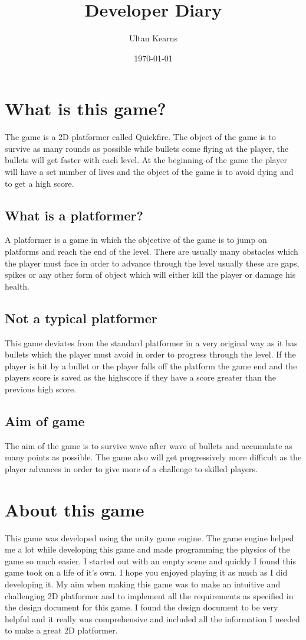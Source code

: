 \documentclass{report}
\title{Developer Diary}
\author{Ultan Kearns}
\date{\today}
\begin{document}
\maketitle
\tableofcontents

\section{What is this game?}
The game is a 2D platformer called Quickfire.  
The object of the game is 
to survive as many rounds as possible while bullets come flying at the player, the bullets will get faster with each level. At the beginning of the game the player will have a set number of lives and the object of the game is to avoid dying and to get a high score.
\subsection{What is a platformer?}
A platformer is a game in which the objective of the game is to jump on platforms and reach the end of the level.  There are usually many obstacles which the player must face in order to advance through the level usually these are gaps, spikes or any other form of object which will either kill the player or damage his health.
\subsection{Not a typical platformer}
This game deviates from the standard platformer in a very original way as it has bullets which the player must avoid in order to progress through the level.  If the player is hit by a bullet or the player falls off the platform the game end and the players score is saved as the highscore if they have a score greater than the previous high score.
\subsection{Aim of game}
The aim of the game is to survive wave after wave of bullets and accumulate as many points as possible.  The game also will get progressively more difficult as the player advances in order to give more of a challenge to skilled players.
\section{About this game}
 This game was developed using the unity game engine.  The game engine helped me a lot while developing this game and made programming the physics of the game so much easier.  I started out with an empty scene and quickly I found this game took on a life of it's own.  I hope you enjoyed playing it as much as I did developing it.  My aim when making this game was to make an intuitive and challenging 2D platformer and to implement all the requirements as specified in the design document for this game.  I found the design document to be very helpful and it really was comprehensive and included all the information I needed to make a great 2D platformer.
\end{document}

